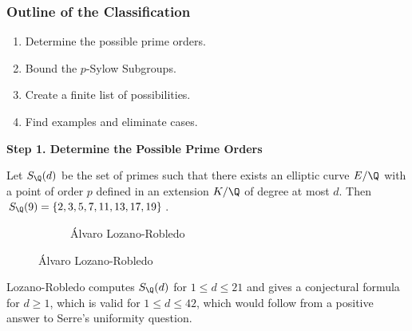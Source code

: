 
\begin{frame}[plain]
\end{frame}



\begin{frame}[plain]
\frametitle{Outline of the Classification}
        \begin{enumerate}
        \item Determine the possible prime orders. \vfill
        \item Bound the $p$-Sylow Subgroups. \vfill
        \item Create a finite list of possibilities. \vfill
        \item Find examples and eliminate cases. \vfill
        \end{enumerate}
\vfill
\end{frame}





\begin{frame}[plain]
\vfill
\begin{center} {\bfseries \Large \textcolor{UniGray}{Step 1. Determine the Possible Prime Orders}} \end{center}
\vfill 
\end{frame}





\begin{frame}[plain]
\begin{thm}
Let $S_\Q(d)$ be the set of primes such that there exists an elliptic curve $E/\Q$ with a point of order $p$ defined in an extension $K/\Q$ of degree at most $d$. Then $S_\Q(9)= \{ 2, 3, 5, 7, 11, 13, 17, 19 \}$.
\end{thm}
	\begin{figure}[h]
	\centering
	\begin{subfigure}{\textwidth}
	\captionsetup{labelformat=empty}
	\centering
	\caption{\'Alvaro Lozano-Robledo}
	\end{subfigure}
	\end{figure}

\begin{rem}
Lozano-Robledo computes $S_\Q(d)$ for $1 \leq d \leq 21$ and gives a conjectural formula for $d \geq 1$, which is valid for $1 \leq d \leq 42$, which would follow from a positive answer to Serre's uniformity question. 
\end{rem}
\end{frame}





